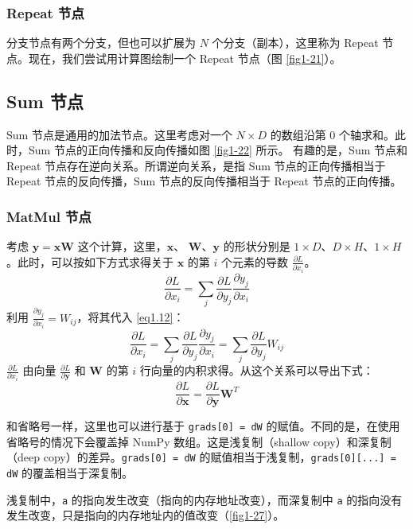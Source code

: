 \subsubsection*{Repeat 节点}
分支节点有两个分支，但也可以扩展为 $N$ 个分支（副本），这里称为 Repeat 节点。现在，我们尝试用计算图绘制一个 Repeat 节点（图 \autoref{fig1-21}）。
\subsection*{Sum 节点}
Sum 节点是通用的加法节点。这里考虑对一个 $N \times D$ 的数组沿第 0 个轴求和。此时，Sum 节点的正向传播和反向传播如图 \autoref{fig1-22} 所示。 有趣的是，Sum 节点和 Repeat 节点存在逆向关系。所谓逆向关系，是指 Sum 节点的正向传播相当于 Repeat 节点的反向传播，Sum 节点的反向传播相当于 Repeat 节点的正向传播。
\subsubsection*{MatMul 节点}
考虑 $\bm{y}=\bm{x}\bm{W}$ 这个计算，这里，$\bm{x}$、
$\bm{W}$、$\bm{y}$ 的形状分别是 $1 \times D$、$D \times H$、$1 \times H$。此时，可以按如下方式求得关于 $\bm{x}$ 的第 $i$ 个元素的导数 $\frac{\partial L}{\partial x_i}$。
\begin{equation}
    \label{eq1.12}
    \frac{\partial L}{\partial x_i}=\sum_{j}\frac{\partial L}{\partial y_j}\frac{\partial y_j}{\partial x_i}
\end{equation}
利用 $\frac{\partial y_j}{\partial x_i}=W_{ij}$，将其代入 \autoref{eq1.12}：
\begin{equation}
    \frac{\partial L}{\partial x_i}=\sum_{j}\frac{\partial L}{\partial y_j}\frac{\partial y_j}{\partial x_i}=\sum_{j}\frac{\partial L}{\partial y_j}W_{ij}
\end{equation}
$\frac{\partial L}{\partial x_i}$ 由向量 $\frac{\partial L}{\partial \bm{y}}$ 和 $\bm{W}$ 的第 $i$ 行向量的内积求得。从这个关系可以导出下式：
\begin{equation}
    \frac{\partial L}{\partial \bm{x}}=\frac{\partial L}{\partial \bm{y}}\bm{W}^T
\end{equation}

和省略号一样，这里也可以进行基于 \verb|grads[0] = dW| 的赋值。不同的是，在使用省略号的情况下会覆盖掉 NumPy 数组。这是浅复制（shallow copy）和深复制（deep copy）的差异。\verb|grads[0] = dW| 的赋值相当于浅复制，\verb|grads[0][...] = dW| 的覆盖相当于深复制。


浅复制中，\verb|a| 的指向发生改变（指向的内存地址改变），而深复制中 \verb|a| 的指向没有发生改变，只是指向的内存地址内的值改变（\autoref{fig1-27}）。
